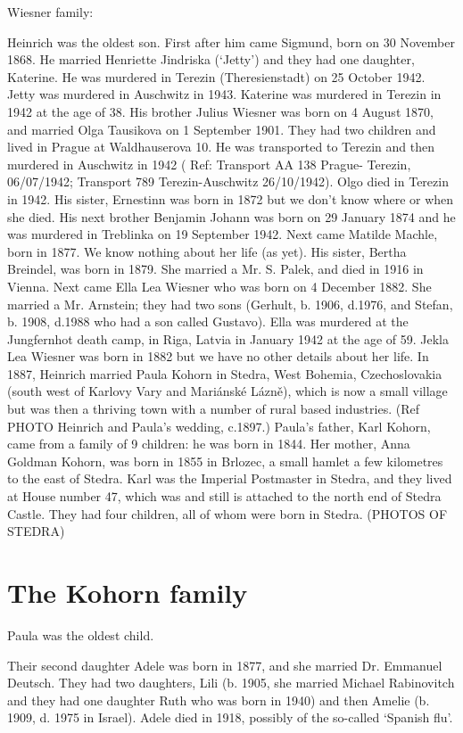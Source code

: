 Wiesner family:

Heinrich was the oldest son.
First after him came Sigmund, born on 30 November 1868. He married Henriette Jindriska (‘Jetty’)
and they had one daughter, Katerine. He was murdered in Terezin (Theresienstadt) on 25 October
1942. Jetty was murdered in Auschwitz in 1943. Katerine was murdered in Terezin in 1942 at the
age of 38.
His brother Julius Wiesner was born on 4 August 1870, and married Olga Tausikova on 1
September 1901. They had two children and lived in Prague at Waldhauserova 10. He was
transported to Terezin and then murdered in Auschwitz in 1942 ( Ref: Transport AA 138 Prague-
Terezin, 06/07/1942; Transport 789 Terezin-Auschwitz 26/10/1942). Olgo died in Terezin in 1942.
His sister, Ernestinn was born in 1872 but we don’t know where or when she died.
His next brother Benjamin Johann was born on 29 January 1874 and he was murdered in Treblinka
on 19 September 1942.
Next came Matilde Machle, born in 1877. We know nothing about her life (as yet).
His sister, Bertha Breindel, was born in 1879. She married a Mr. S. Palek, and died in 1916 in
Vienna.
Next came Ella Lea Wiesner who was born on 4 December 1882. She married a Mr. Arnstein; they
had two sons (Gerhult, b. 1906, d.1976, and Stefan, b. 1908, d.1988 who had a son called
Gustavo). Ella was murdered at the Jungfernhot death camp, in Riga, Latvia in January 1942 at the
age of 59.
Jekla Lea Wiesner was born in 1882 but we have no other details about her life.
In 1887, Heinrich married Paula Kohorn in Stedra, West Bohemia, Czechoslovakia (south west of
Karlovy Vary and Mariánské Lázně), which is now a small village but was then a thriving town
with a number of rural based industries.
(Ref PHOTO Heinrich and Paula's wedding, c.1897.)
Paula’s father, Karl Kohorn, came from a family of 9 children: he was born in 1844. Her mother,
Anna Goldman Kohorn, was born in 1855 in Brlozec, a small hamlet a few kilometres to the east of
Stedra. Karl was the Imperial Postmaster in Stedra, and they lived at House number 47, which was
and still is attached to the north end of Stedra Castle. They had four children, all of whom were
born in Stedra. (PHOTOS OF STEDRA)

\section{The Kohorn family}

Paula was the oldest child.

Their second daughter Adele was born in 1877, and she married Dr. Emmanuel Deutsch. They had
two daughters, Lili (b. 1905, she married Michael Rabinovitch and they had one daughter Ruth who
was born in 1940) and then Amelie (b. 1909, d. 1975 in Israel). Adele died in 1918, possibly of the
so-called ‘Spanish flu’.

